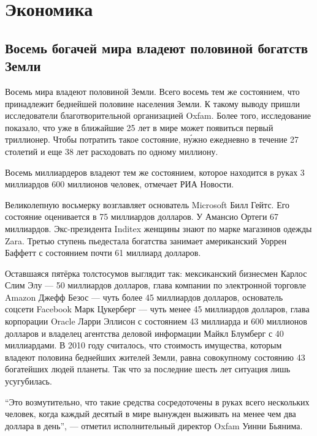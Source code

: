\chapter{Экономика}

\section{Восемь богачей мира владеют половиной богатств Земли}
Восемь  мира владеют половиной  Земли. Всего восемь   тем же состоянием, что принадлежит беднейшей половине населения Земли. К такому выводу пришли исследователи благотворительной организацией Oxfam. Более того, исследование показало, что уже в ближайшие 25 лет в мире может появиться первый триллионер. Чтобы потратить такое состояние, н\'{у}жно ежедневно в течение 27 столетий и еще 38 лет расходовать по одному миллиону.

Восемь миллиардеров владеют тем же состоянием, которое находится в руках 3 миллиардов 600 миллионов человек, отмечает РИА Новости.

Великолепную восьмерку возглавляет основатель Microsoft Билл Гейтс. Его состояние оценивается в 75 миллиардов долларов. У Амансио Ортеги 67 миллиардов. Экс-президента Inditex женщины знают по марке магазинов одежды Zara. Третью ступень пьедестала богатства занимает американский  Уоррен Баффетт с состоянием почти 61 миллиард долларов.

Оставшаяся пятёрка толстосумов выглядит так: мексиканский бизнесмен Карлос Слим Элу --- 50 миллиардов долларов, глава компании по электронной торговле Amazon Джефф Безос --- чуть более 45 миллиардов долларов, основатель соцсети Facebook Марк Цукерберг --- чуть менее 45 миллиардов долларов, глава корпорации Oracle Ларри Эллисон с состоянием 43 миллиарда и 600 миллионов долларов и владелец агентства деловой информации Майкл Блумберг с 40 миллиардами.
В 2010 году считалось, что стоимость имущества, которым владеют половина беднейших жителей Земли, равна совокупному состоянию 43 богатейших людей планеты. Так что за последние шесть лет ситуация лишь усугубилась.

``Это возмутительно, что такие средства сосредоточены в руках всего нескольких человек, когда каждый десятый в мире вынужден выживать на менее чем два доллара в день'', --- отметил исполнительный директор Oxfam Уинни Бьянима.

